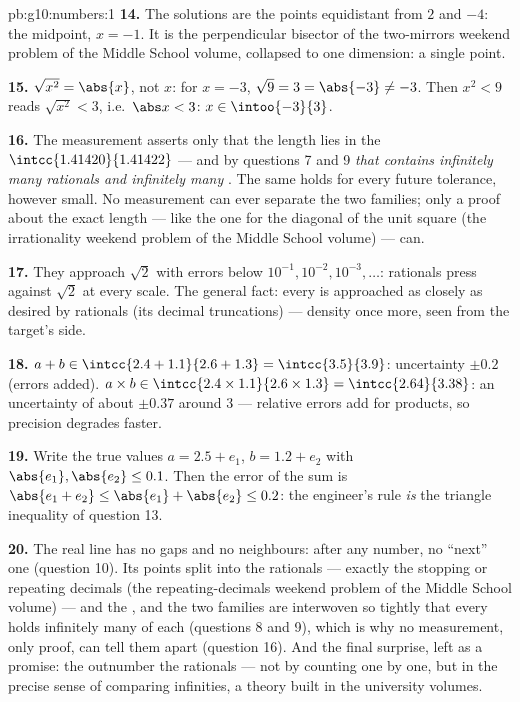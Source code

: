 \begin{solution}{pb:g10:numbers:1}
\textbf{14.} The solutions are the points equidistant from $2$
and $-4$: the midpoint, $x = -1$. It is the perpendicular
bisector of the two-mirrors weekend problem of the Middle School volume, collapsed to one
dimension: a single point.

\textbf{15.} $\sqrt{x^2} = \abs{x}$, not $x$: for $x = -3$,
$\sqrt{9} = 3 = \abs{-3} \neq -3$. Then $x^2 < 9$ reads
$\sqrt{x^2} < 3$, i.e.\ $\abs x < 3$:
$x \in \intoo{-3}{3}$.

\textbf{16.} The measurement asserts only that the length lies
in the  $\intcc{1.41420}{1.41422}$ --- and by questions
7 and 9 \emph{that  contains infinitely many rationals
and infinitely many }. The same holds for every
future tolerance, however small. No measurement can ever
separate the two families; only a proof about the exact length
--- like the one for the diagonal of the unit square
(the irrationality weekend problem of the Middle School volume) --- can.

\textbf{17.} They approach $\sqrt2$ with errors below
$10^{-1}, 10^{-2}, 10^{-3}, \dots$: rationals press against
$\sqrt2$ at every scale. The general fact: every  is
approached as closely as desired by rationals (its decimal
truncations) --- density once more, seen from the target's
side.

\textbf{18.} $a + b \in \intcc{2.4 + 1.1}{2.6 + 1.3} =
\intcc{3.5}{3.9}$: uncertainty $\pm 0.2$ (errors added).
$a \times b \in \intcc{2.4 \times 1.1}{2.6 \times 1.3} =
\intcc{2.64}{3.38}$: an uncertainty of about $\pm 0.37$ around
$3$ --- relative errors add for products, so precision degrades
faster.

\textbf{19.} Write the true values $a = 2.5 + e_1$,
$b = 1.2 + e_2$ with $\abs{e_1}, \abs{e_2} \leq 0.1$. Then the
error of the sum is $\abs{e_1 + e_2} \leq \abs{e_1} +
\abs{e_2} \leq 0.2$: the engineer's rule \emph{is} the triangle
inequality of question 13.

\textbf{20.} The real line has no gaps and no neighbours: after
any number, no ``next'' one (question 10). Its points split
into the rationals --- exactly the stopping or repeating
decimals (the repeating-decimals weekend problem of the Middle School volume) --- and the ,
and the two families are interwoven so tightly that every
 holds infinitely many of each (questions 8 and 9),
which is why no measurement, only proof, can tell them apart
(question 16). And the final surprise, left as a promise: the
 outnumber the rationals --- not by counting one by
one, but in the precise sense of comparing infinities, a
theory built in the university volumes.
\end{solution}

